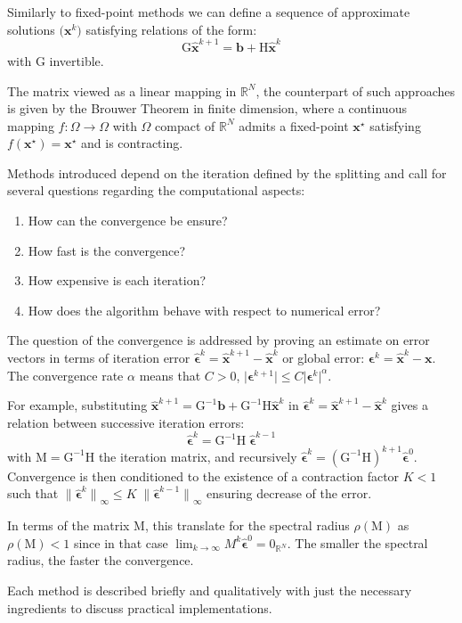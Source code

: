 \documentclass{article}
\newcommand{\xR}{\mathbb{R}}
\newcommand{\xRN}{{\xR^N}}
\newcommand{\bb}{{\boldsymbol b}}
\newcommand{\ev}{{\boldsymbol \epsilon}}
\newcommand{\xx}{{\boldsymbol x}}
\newcommand{\hx}{\hat{\boldsymbol x}}
\newcommand{\mG}{{\mathrm G}}
\newcommand{\mH}{{\mathrm H}}
\newcommand{\mM}{{\mathrm M}}
\newcommand{\Seq}[1]{\bigl(#1\bigr)}
\newcommand{\norm}[1]{{\lVert #1 \rVert}}
\newcommand{\norminf}[1]{\norm{#1}_{\infty}}
\begin{document}
Similarly to fixed-point methods we can define a sequence of approximate solutions $\Seq{\xx^k}$ satisfying relations of the form:
\[
\mG \hx^{k+1} = \bb + \mH \hx^{k}
\]
with $\mG$ invertible.

The matrix viewed as a linear mapping in $\xRN$, the counterpart of such approaches is given by the Brouwer Theorem in finite dimension, where a continuous mapping $f : \Omega \rightarrow \Omega$ with $\Omega$ compact of $\xRN$ admits a fixed-point $\xx^\star$ satisfying $f(\xx^\star) = \xx^\star$ and is contracting.

\medskip
Methods introduced depend on the iteration defined by the splitting and call for several questions regarding the computational aspects:
\begin{enumerate}
\item How can the convergence be ensure?
\item How fast is the convergence?
\item How expensive is each iteration?
\item How does the algorithm behave with respect to numerical error?
\end{enumerate}

\medskip
The question of the convergence is addressed by proving an estimate on error vectors in terms of iteration error $\hat{\ev}^k = \hx^{k+1}-\hx^{k}$ or global error: $\ev^k = \hx^{k}-\xx$. The convergence rate $\alpha$ means that $C > 0$, $\lvert\ev^{k+1}\rvert \leq C \lvert\ev^{k}\rvert^\alpha$.

\medskip
For example, substituting $\hx^{k+1} = \mG^{-1}\bb + \mG^{-1}\mH \hx^{k}$ in $\hat{\ev}^k = \hx^{k+1}-\hx^{k}$ gives a relation between successive iteration errors:
\[
\hat{\ev}^{k} = \mG^{-1}\mH\;\hat{\ev}^{k-1}
\]
with $\mM = \mG^{-1}\mH$ the iteration matrix, and recursively $\hat{\ev}^{k} = (\mG^{-1}\mH)^{k+1}\hat{\ev}^{0}$.
Convergence is then conditioned to the existence of a contraction factor $K < 1$ such that $\norminf{\hat{\ev}^{k}} \leq K\;\norminf{\hat{\ev}^{k-1}}$ ensuring decrease of the error.

\medskip
In terms of the matrix $\mM$, this translate for the spectral radius $\rho(\mM)$ as $\rho(\mM) < 1$ since in that case $\lim_{k\rightarrow\infty} M^k \hat{\ev}^{0} = 0_{\xRN}$.
The smaller the spectral radius, the faster the convergence.

\medskip
Each method is described briefly and qualitatively with just the necessary ingredients to discuss practical implementations.
\end{document}
